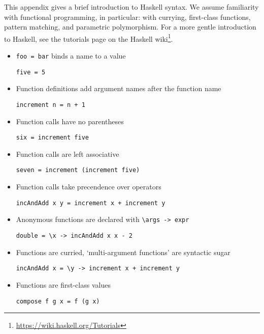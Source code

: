 This appendix gives a brief introduction to Haskell syntax.  We assume
familiarity with functional programming, in particular: with currying,
first-class functions, pattern matching, and parametric polymorphism.
For a more gentle introduction to Haskell, see the tutorials page on
the Haskell wiki\footnote{\url{https://wiki.haskell.org/Tutorials}}.

\begin{itemize}
\item \verb|foo = bar| binds a name to a value
\begin{verbatim}
five = 5
\end{verbatim}

\item Function definitions add argument names after the function name
\begin{verbatim}
increment n = n + 1
\end{verbatim}

\item Function calls have no parentheses
\begin{verbatim}
six = increment five
\end{verbatim}

\item Function calls are left associative
\begin{verbatim}
seven = increment (increment five)
\end{verbatim}

\item Function calls take precendence over operators
\begin{verbatim}
incAndAdd x y = increment x + increment y
\end{verbatim}

\item Anonymous functions are declared with \verb|\args -> expr|
\begin{verbatim}
double = \x -> incAndAdd x x - 2
\end{verbatim}

\item Functions are curried, `multi-argument functions' are syntactic
  sugar
\begin{verbatim}
incAndAdd x = \y -> increment x + increment y
\end{verbatim}

\item Functions are first-class values
\begin{verbatim}
compose f g x = f (g x)
\end{verbatim}


\end{itemize}
